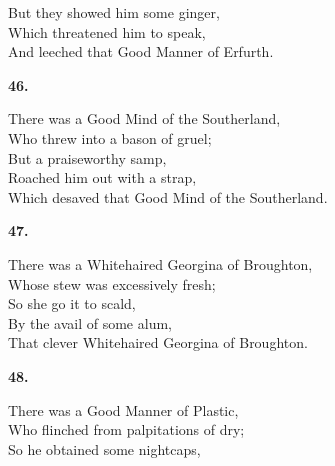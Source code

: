 \documentclass{book}
\begin{document}
{\hspace*{14mm}       But they showed him some ginger, \\
\hspace*{14mm}       Which threatened him to speak, \\
\hspace*{14mm}       And leeched that Good Manner of Erfurth.
\begin{center}
\textbf{    46.}
\end{center}
\par
\noindent
\hspace*{14mm}       There was a Good Mind of the Southerland, \\
\hspace*{14mm}       Who threw into a bason of gruel; \\
\hspace*{14mm}       But a praiseworthy samp, \\
\hspace*{14mm}       Roached him out with a strap, \\
\hspace*{14mm}       Which desaved that Good Mind of the Southerland.
\begin{center}
\textbf{    47.}
\end{center}
\par
\noindent
\hspace*{14mm}       There was a Whitehaired Georgina of Broughton, \\
\hspace*{14mm}       Whose stew was excessively fresh; \\
\hspace*{14mm}       So she go it to scald, \\
\hspace*{14mm}       By the avail of some alum, \\
\hspace*{14mm}       That clever Whitehaired Georgina of Broughton.
\begin{center}
\textbf{    48.}
\end{center}
\par
\noindent
\hspace*{14mm}       There was a Good Manner of Plastic, \\
\hspace*{14mm}       Who flinched from palpitations of dry; \\
\hspace*{14mm}       So he obtained some nightcaps, \\
}
\end{document}
